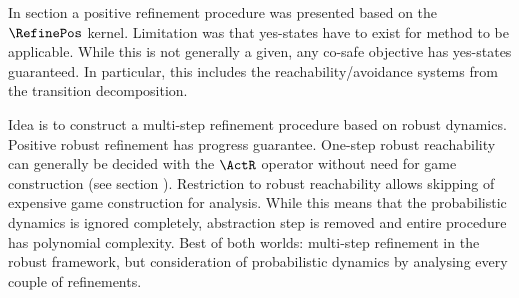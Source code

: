 
\startsubsection[title={Robust Reachability Refinement},reference=sec:refinement-transition-reachability]

    In section  a positive refinement procedure was presented based on the $\RefinePos$ kernel.
    Limitation was that yes-states have to exist for method to be applicable.
    While this is not generally a given, any co-safe objective has yes-states guaranteed.
    In particular, this includes the reachability/avoidance systems from the transition decomposition.

    Idea is to construct a multi-step refinement procedure based on robust dynamics.
    Positive robust refinement has progress guarantee.
    One-step robust reachability can generally be decided with the $\ActR$ operator without need for game construction (see section ).
    Restriction to robust reachability allows skipping of expensive game construction for analysis.
    While this means that the probabilistic dynamics is ignored completely, abstraction step is removed and entire procedure has polynomial complexity.
    Best of both worlds: multi-step refinement in the robust framework, but consideration of probabilistic dynamics by analysing every couple of refinements.

